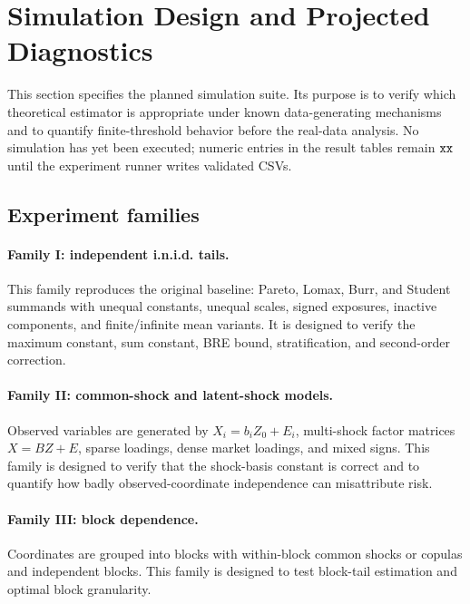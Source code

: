\section{Simulation Design and Projected Diagnostics}
\label{sec:simulation-plan}

This section specifies the planned simulation suite. Its purpose is to verify
which theoretical estimator is appropriate under known data-generating
mechanisms and to quantify finite-threshold behavior before the real-data
analysis. No simulation has yet been executed; numeric entries in the
result tables remain $\xx{}$ until the experiment runner writes validated
CSVs.

\subsection{Experiment families}

\paragraph{Family I: independent i.n.i.d. tails.}
This family reproduces the original baseline: Pareto, Lomax, Burr, and Student
summands with unequal constants, unequal scales, signed exposures, inactive
components, and finite/infinite mean variants. It is designed to verify the
maximum constant, sum constant, BRE bound, stratification, and second-order
correction.

\paragraph{Family II: common-shock and latent-shock models.}
Observed variables are generated by \(X_i=b_iZ_0+E_i\), multi-shock factor
matrices \(X=BZ+E\), sparse loadings, dense market loadings, and mixed signs.
This family is designed to verify that the shock-basis constant is correct and
to quantify how badly observed-coordinate independence can misattribute risk.

\paragraph{Family III: block dependence.}
Coordinates are grouped into blocks with within-block common shocks or copulas
and independent blocks. This family is designed to test block-tail estimation
and optimal block granularity.

